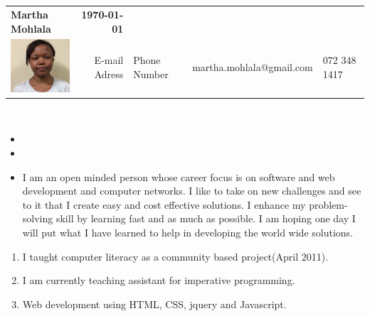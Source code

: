 %
\\ \\

\begin{tabular*}{6.5in}{l@{\extracolsep{\fill}}r}
\textbf{\Large } \textbf{Martha Mohlala} & \textbf{\today} \\
\includegraphics{./images/martha} & E-mail
Adress & Phone Number & martha.mohlala@gmail.com & 072 348 1417
\end{tabular*}
\\

\begin{itemize}

\item {}

\item {}

\end{itemize}


\begin{itemize}
 \item %
I am an open minded person whose career focus is on software and web development and computer networks. I like to take on new challenges and see to it that I create easy and cost effective solutions. I enhance my problem-solving skill by learning fast and as much as possible. I am hoping one day I will put what I have  learned to help in developing the world wide solutions.
\end{itemize}



\begin{enumerate}
\item I taught computer literacy as a community based project(April 2011).
 \item I am currently teaching assistant for imperative programming.
 \item Web development using HTML, CSS, jquery and Javascript. 
\end{enumerate}

